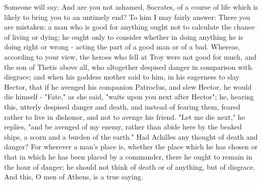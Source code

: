 \documentclass[11pt]{article}
\begin{document}
Someone will say: And are you not ashamed, Socrates, of a course of life which is likely to bring you to an untimely end? To him I may fairly answer: There you are mistaken: a man who is good for anything ought not to calculate the chance of living or dying; he ought only to consider whether in doing anything he is doing right or wrong - acting the part of a good man or of a bad. Whereas, according to your view, the heroes who fell at Troy were not good for much, and the son of Thetis above all, who altogether despised danger in comparison with disgrace; and when his goddess mother said to him, in his eagerness to slay Hector, that if he avenged his companion Patroclus, and slew Hector, he would die himself - "Fate," as she said, "waits upon you next after Hector"; he, hearing this, utterly despised danger and death, and instead of fearing them, feared rather to live in dishonor, and not to avenge his friend. "Let me die next," he replies, "and be avenged of my enemy, rather than abide here by the beaked ships, a scorn and a burden of the earth." Had Achilles any thought of death and danger? For wherever a man's place is, whether the place which he has chosen or that in which he has been placed by a commander, there he ought to remain in the hour of danger; he should not think of death or of anything, but of disgrace. And this, O men of Athens, is a true saying.
\end{document}
